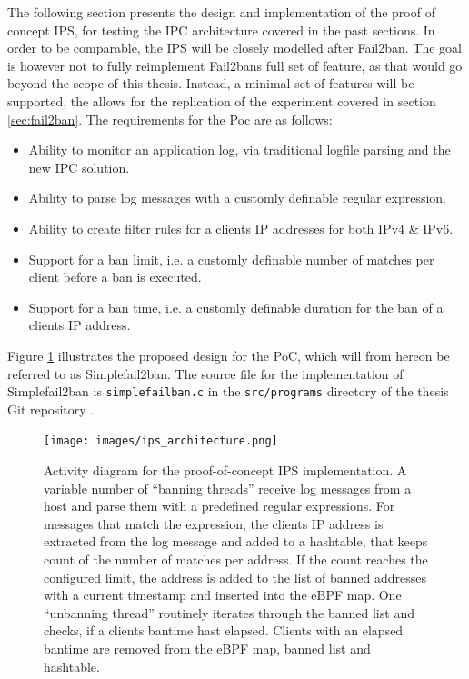 The following section presents the design and implementation of the proof of concept \ac{IPS}, for testing the \ac{IPC} architecture covered in the past sections.
In order to be comparable, the \ac{IPS} will be closely modelled after Fail2ban. The goal is however not to fully reimplement Fail2bans full set of feature, as that would go beyond
the scope of this thesis. Instead, a minimal set of features will be supported, the allows for the replication of the experiment covered in section \ref{sec:fail2ban}. 
The requirements for the \ac{Poc} are as follows:
\begin{itemize}
    \item Ability to monitor an application log, via traditional logfile parsing and the new \ac{IPC} solution.
    \item Ability to parse log messages with a customly definable regular expression.
    \item Ability to create filter rules for a clients IP addresses for both \ac{IPv4} \& \ac{IPv6}.
    \item Support for a ban limit, i.e. a customly definable number of matches per client before a ban is executed.
    \item Support for a ban time, i.e. a customly definable duration for the ban of a clients IP address. 
\end{itemize} 

Figure \ref{fig:ips_architecture} illustrates the proposed design for the \ac{PoC}, which will from hereon be referred to as Simplefail2ban. The source file 
for the implementation of Simplefail2ban is \texttt{simplefailban.c} in the \texttt{src/programs} directory of the thesis Git repository \cite{gitlab}.


\begin{figure}[p]
    \texttt{[image: images/ips\_architecture.png]}
    \caption[Simplefail2ban Architecture]{Activity diagram for the proof-of-concept IPS implementation. A variable number of ``banning threads'' receive log messages from a host and
    parse them with a predefined regular expressions. For messages that match the expression, the clients IP address is extracted from the log message and added to a hashtable, that keeps count of
    the number of matches per address. If the count reaches the configured limit, the address is added to the list of banned addresses with a current timestamp and inserted into the eBPF map. One ``unbanning
   thread'' routinely iterates through the banned list and checks, if a clients bantime hast elapsed. Clients with an elapsed bantime are removed from the eBPF map, banned list and hashtable.}
   \label{fig:ips_architecture}
\end{figure}

